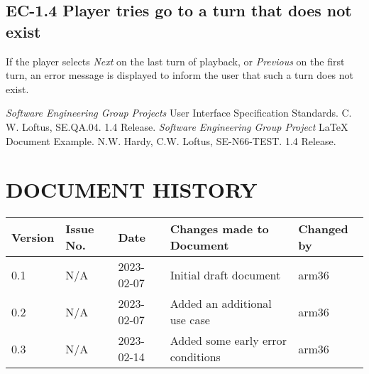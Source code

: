\documentclass{project}
\begin{document}
\subsection{EC-1.4 Player tries go to a turn that does not exist}
If the player selects \emph{Next} on the last turn of playback, or \emph{Previous} on the first turn, an error message is displayed to inform the user that such a turn does not exist.
\clearpage
{}
\begin{thebibliography}{5}
 \emph{Software Engineering Group Projects}
User Interface Specification Standards.
C. W. Loftus, SE.QA.04. 1.4 Release.
 \emph{Software Engineering Group Project}
LaTeX Document Example.
N.W. Hardy, C.W. Loftus, SE-N66-TEST. 1.4 Release.
\end{thebibliography}
\section*{DOCUMENT HISTORY}
\begin{tabular}{|l | l | l | l | l |}
\hline
Version & Issue No. & Date & Changes made to Document & Changed by \\
\hline
0.1 & N/A & 2023-02-07 & Initial draft document & arm36 \\
\hline
0.2 & N/A & 2023-02-07 & Added an additional use case & arm36 \\
\hline
0.3 & N/A & 2023-02-14 & Added some early error conditions & arm36 \\
\hline
\end{tabular}
\label{thelastpage}
\end{document}
